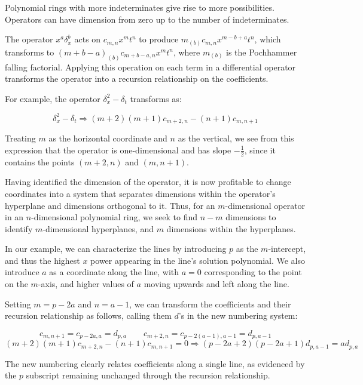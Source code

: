 \documentclass{article}
\begin{document}
Polynomial rings with more indeterminates give rise to more possibilities.
Operators can have dimension from zero up to the number of indeterminates.

The operator $x^a \delta_x^b$ acts on $c_{m,n} x^m t^n$ to produce
$m_{(b)} c_{m,n} x^{m-b+a} t^n$, which transforms to $(m+b-a)_{(b)}
c_{m+b-a,n} x^m t^n$, where $m_{(b)}$ is the Pochhammer falling
factorial.  Applying this operation on each term in a differential
operator transforms the operator into a recursion relationship on the
coefficients.

For example, the operator $\delta_x^2 - \delta_t$ transforms as:

$$\delta_x^2 - \delta_t \Longrightarrow (m+2)(m+1)c_{m+2,n} - (n+1)c_{m,n+1}$$

Treating $m$ as the horizontal coordinate and $n$ as the vertical, we
see from this expression that the operator is one-dimensional and has
slope $-\frac{1}{2}$, since it contains the points $(m+2,n)$ and
$(m,n+1)$.

Having identified the dimension of the operator, it is now profitable
to change coordinates into a system that separates dimensions within
the operator's hyperplane and dimensions orthogonal to it.  Thus, for
an $m$-dimensional operator in an $n$-dimensional polynomial ring, we
seek to find $n-m$ dimensions to identify $m$-dimensional hyperplanes,
and $m$ dimensions within the hyperplanes.

In our example, we can characterize the lines by introducing
$p$ as the $m$-intercept, and thus the highest $x$ power appearing in
the line's solution polynomial.  We also introduce $a$ as a coordinate
along the line, with $a=0$ corresponding to the point on the $m$-axis,
and higher values of $a$ moving upwards and left along the line.

Setting $m=p-2a$ and $n=a-1$, we can transform the coefficients and
their recursion relationship as follows, calling them $d$'s in the new
numbering system:

$$c_{m,n+1} = c_{p-2a,a} = d_{p,a}  \qquad c_{m+2,n} = c_{p-2(a-1),a-1} = d_{p,a-1}$$
$$(m+2)(m+1)c_{m+2,n} - (n+1)c_{m,n+1} = 0 \Longrightarrow (p-2a+2)(p-2a+1) d_{p,a-1} = a d_{p,a}$$

The new numbering clearly relates coefficients along a single line, as
evidenced by the $p$ subscript remaining unchanged through the
recursion relationship.
\end{document}
